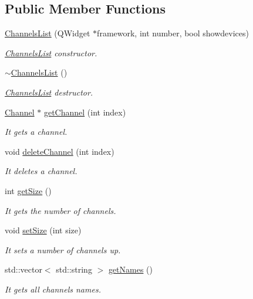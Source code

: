 \subsection*{Public Member Functions}
\begin{DoxyCompactItemize}
\item 
\hyperlink{class_channels_list_a2be2b5b850d9841fc90208afc7c6f112}{Channels\+List} (Q\+Widget $\ast$framework, int number, bool showdevices)
\begin{DoxyCompactList}\small\item\em \hyperlink{class_channels_list}{Channels\+List} constructor. \end{DoxyCompactList}\item 
\mbox{\label{class_channels_list_a264a8cdd2dc552462b1de06ec02729ec}} 
\hyperlink{class_channels_list_a264a8cdd2dc552462b1de06ec02729ec}{$\sim$\+Channels\+List} ()
\begin{DoxyCompactList}\small\item\em \hyperlink{class_channels_list}{Channels\+List} destructor. \end{DoxyCompactList}\item 
\hyperlink{class_channel}{Channel} $\ast$ \hyperlink{class_channels_list_a794574bee033fd0fa2bee54c615576f9}{get\+Channel} (int index)
\begin{DoxyCompactList}\small\item\em It gets a channel. \end{DoxyCompactList}\item 
void \hyperlink{class_channels_list_a72dfd281e40fd29624354254ad3fa791}{delete\+Channel} (int index)
\begin{DoxyCompactList}\small\item\em It deletes a channel. \end{DoxyCompactList}\item 
int \hyperlink{class_channels_list_aeaeb08c6bf8aa1a48b5cc52c56505408}{get\+Size} ()
\begin{DoxyCompactList}\small\item\em It gets the number of channels. \end{DoxyCompactList}\item 
void \hyperlink{class_channels_list_ac059e3c89763f50705ce1e2633ee3d3d}{set\+Size} (int size)
\begin{DoxyCompactList}\small\item\em It sets a number of channels up. \end{DoxyCompactList}\item 
std\+::vector$<$ std\+::string $>$ \hyperlink{class_channels_list_a17482d918a0dbbd4bf0fc2a22ee67668}{get\+Names} ()
\begin{DoxyCompactList}\small\item\em It gets all channels names. \end{DoxyCompactList}\end{DoxyCompactItemize}
